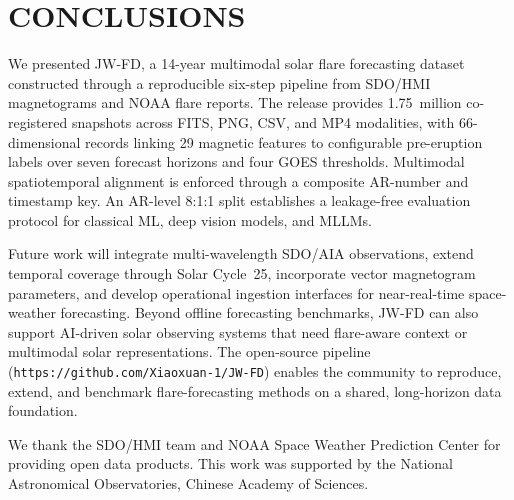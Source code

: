 \documentclass[]{spie}
\begin{document}
\section{CONCLUSIONS}
\label{sec:concl}

We presented JW-FD, a 14-year multimodal solar flare forecasting dataset constructed through a reproducible six-step pipeline from SDO/HMI magnetograms and NOAA flare reports. The release provides 1.75~million co-registered snapshots across FITS, PNG, CSV, and MP4 modalities, with 66-dimensional records linking 29 magnetic features to configurable pre-eruption labels over seven forecast horizons and four GOES thresholds. Multimodal spatiotemporal alignment is enforced through a composite AR-number and timestamp key. An AR-level 8:1:1 split establishes a leakage-free evaluation protocol for classical ML, deep vision models, and MLLMs.

Future work will integrate multi-wavelength SDO/AIA observations, extend temporal coverage through Solar Cycle~25, incorporate vector magnetogram parameters, and develop operational ingestion interfaces for near-real-time space-weather forecasting. Beyond offline forecasting benchmarks, JW-FD can also support AI-driven solar observing systems that need flare-aware context or multimodal solar representations.\cite{Lin2026sidest,Tong2026astclaw,Tong2026aims} The open-source pipeline (\texttt{https://github.com/Xiaoxuan-1/JW-FD}) enables the community to reproduce, extend, and benchmark flare-forecasting methods on a shared, long-horizon data foundation.

\acknowledgments
We thank the SDO/HMI team and NOAA Space Weather Prediction Center for providing open data products. This work was supported by the National Astronomical Observatories, Chinese Academy of Sciences.



\end{document}
